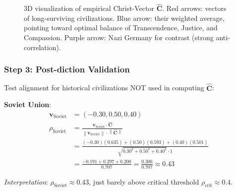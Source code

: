\documentclass[11pt,a4paper]{article}
\theoremstyle{definition}
\theoremstyle{remark}
\newcommand{\norm}[1]{\left\|#1\right\|}
\begin{document}
\begin{small}
\begin{figure}[H]
\caption{3D visualization of empirical Christ-Vector \(\hat{\mathbf{C}}\). Red arrows: vectors of long-surviving civilizations. Blue arrow: their weighted average, pointing toward optimal balance of Transcendence, Justice, and Compassion. Purple arrow: Nazi Germany for contrast (strong anti-correlation).}
\label{fig:christ_vector_3d}
\end{figure}

\subsubsection{Step 3: Post-diction Validation}

Test alignment for historical civilizations NOT used in computing \(\hat{\mathbf{C}}\):

\textbf{Soviet Union}:
\begin{align}
\mathbf{v}_{\text{Soviet}} &= (-0.30, 0.50, 0.40) \\
\rho_{\text{Soviet}} &= \frac{\mathbf{v}_{\text{Soviet}} \cdot \hat{\mathbf{C}}}{\norm{\mathbf{v}_{\text{Soviet}}} \cdot \norm{\hat{\mathbf{C}}}} \\
&= \frac{(-0.30)(0.635) + (0.50)(0.593) + (0.40)(0.501)}{\sqrt{0.30^2 + 0.50^2 + 0.40^2} \cdot 1} \\
&= \frac{-0.191 + 0.297 + 0.200}{0.707} = \frac{0.306}{0.707} \approx 0.43
\end{align}

\textit{Interpretation}: \(\rho_{\text{Soviet}} \approx 0.43\), just barely above critical threshold \(\rho_{\text{crit}} \approx 0.4\). 


\end{small}
\end{document}
